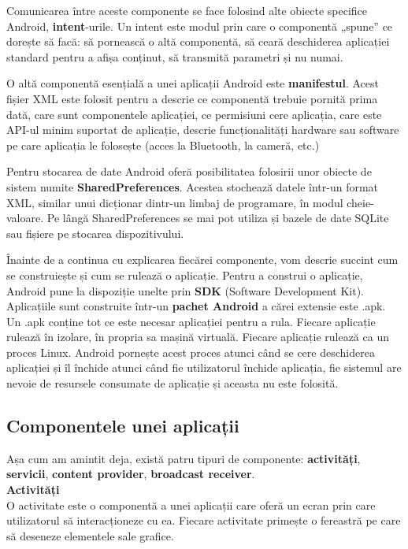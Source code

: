 \documentclass[12pt,a4paper]{article}
\begin{document}
Comunicarea între aceste componente se face folosind alte obiecte specifice Android, \textbf{intent}-urile. Un intent este modul prin care o componentă „spune” ce dorește să facă: să pornească o altă componentă, să ceară deschiderea aplicației standard pentru a afișa conținut, să transmită parametri și nu numai.

O altă componentă esențială a unei aplicații Android este \textbf{manifestul}. Acest fișier XML este folosit pentru a descrie ce componentă trebuie pornită prima dată, care sunt componentele aplicației, ce permisiuni cere aplicația, care este API-ul minim suportat de aplicație, descrie funcționalități hardware sau software pe care aplicația le folosește (acces la Bluetooth, la cameră, etc.)

Pentru stocarea de date Android oferă posibilitatea folosirii unor obiecte de sistem numite \textbf{SharedPreferences}. Acestea stochează datele într-un format XML, similar unui dicționar dintr-un limbaj de programare, în modul cheie-valoare. Pe lângă SharedPreferences se mai pot utiliza și bazele de date SQLite sau fișiere pe stocarea dispozitivului.

Înainte de a continua cu explicarea fiecărei componente, vom descrie succint cum se construiește și cum se rulează o aplicație. Pentru a construi o aplicație, Android pune la dispoziție unelte prin \textbf{SDK} (Software Development Kit). Aplicațiile sunt construite într-un \textbf{pachet Android} a cărei extensie este .apk. Un .apk conține tot ce este necesar aplicației pentru a rula. Fiecare aplicație rulează în izolare, în propria sa mașină virtuală. Fiecare aplicație rulează ca un proces Linux. Android pornește acest proces atunci când se cere deschiderea aplicației și îl închide atunci când fie utilizatorul închide aplicația, fie sistemul are nevoie de resursele consumate de aplicație și aceasta nu este folosită.

\newpage
\subsection{Componentele unei aplicații}
Așa cum am amintit deja, există patru tipuri de componente: \textbf{activități}, \textbf{servicii}, \textbf{content provider}, \textbf{broadcast receiver}.\\

\textbf{Activități}\\
O activitate este o componentă a unei aplicații care oferă un ecran prin care utilizatorul să interacționeze cu ea. Fiecare activitate primește o fereastră pe care să deseneze elementele sale grafice.
\end{document}
